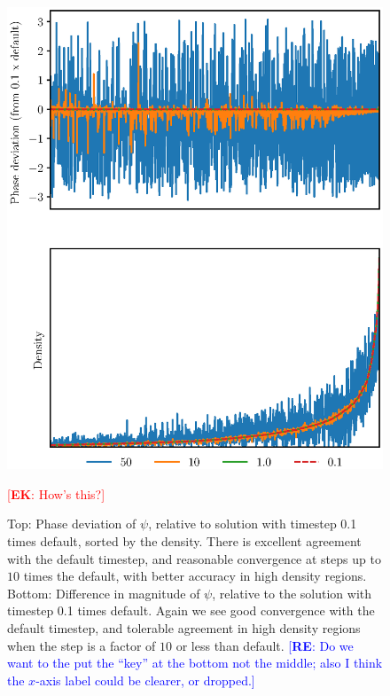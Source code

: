 \documentclass[a4paper,11pt]{article}
\newcommand{\re}[1]{\textcolor{blue}{[{\bf RE}: #1]}}
\newcommand{\ek}[1]{\textcolor{red}{[{\bf EK}: #1]}}
\begin{document}
\begin{figure} 
  \includegraphics[width=1.\textwidth,trim=0 1cm 0 2cm,clip]{combined}
  \caption{Top: Phase deviation of $\psi$, relative to solution with timestep 0.1 times default, sorted by the density. There is excellent agreement with the default timestep, and reasonable convergence at steps up to $10$ times the default, with better accuracy in high density regions. Bottom: Difference in magnitude of $\psi$, relative to the  solution with timestep 0.1 times default. Again we see good convergence with the default timestep, and tolerable agreement in high density regions when the step is a factor of $10$ or less than default. \re{Do we want to the put the ``key'' at the bottom not the middle; also I think the $x$-axis label could be clearer, or dropped.}}\ek{How's this?}
  \label{fig:temporal}
\end{figure}
\clearpage
\end{document}
